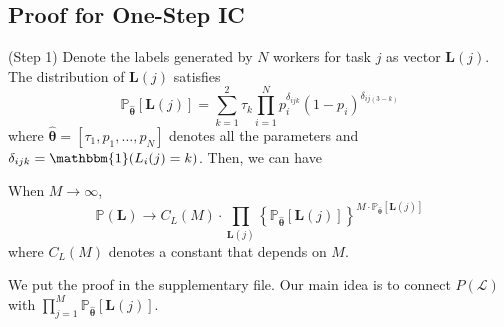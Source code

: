 

\subsection{Proof for One-Step IC}
(Step 1) Denote the labels generated by $N$ workers for task $j$ as vector $\bm{L}(j)$.
The distribution of $\bm{L}(j)$ satisfies
\begin{equation}
\mathbb{P}_{\hat{\bm{\theta}}}[\bm{L}(j)] = {\sum}_{k=1}^{2}\tau_k{\prod}_{i=1}^{N}p_i^{\delta_{ijk}}(1-p_i)^{\delta_{ij(3-k)}}
\end{equation}
where $\hat{\bm{\theta}}=[\tau_1, p_1,\ldots,p_N]$ denotes all the parameters and $\delta_{ijk}=\mathbbm{1}(L_i(j)=k)$.
Then, we can have
\begin{theorem}
\label{Denominator}
When $M\rightarrow \infty$, 
\begin{equation*}
\mathbb{P}(\bm{L})\rightarrow C_{L}(M) \cdot {\prod}_{\bm{L}(j)} \left\{\mathbb{P}_{\hat{\bm{\theta}}}[\bm{L}(j)]\right\}^{M\cdot \mathbb{P}_{\hat{\bm{\theta}}}[\bm{L}(j)]}
\end{equation*}
where $C_{L}(M)$ denotes a constant that depends on $M$.
\end{theorem}
We put the proof in the supplementary file.
Our main idea is to connect $P(\mathcal{L})$ with ${\prod}_{j=1}^{M}\mathbb{P}_{\hat{\bm{\theta}}}[\bm{L}(j)] $.

